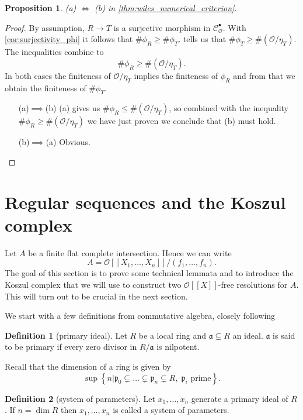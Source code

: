 \documentclass{article}
\theoremstyle{plain}%
\newtheorem{proposition}{Proposition}[section]
\theoremstyle{definition}
\newtheorem{definition}{Definition}[section]
\theoremstyle{remark}
\newcommand{\cob}{\mathcal{C}_\mathcal{O}^\bullet}
\begin{document}
\begin{proposition}\textup{\cite[cf.][corollary 5.6]{darmon1995fermat}}\label{prop:aequalsb}
    (a) \(\Leftrightarrow\) (b) in \cref{thm:wiles_numerical_criterion}.
\end{proposition}
\begin{proof}
    By assumption, \(R \to T\) is a surjective morphism in \(\cob\).
    With \cref{cor:surjectivity_phi} it follows that \(\#\phi_R \geq \#\phi_T\).  
    tells us that \(\#\phi_T \geq \#(\mathcal{O}/\eta_T)\).
    The inequalities combine to \[\#\phi_R \geq \#(\mathcal{O}/\eta_T).\]
    In both cases the finiteness of \(\mathcal{O}/\eta_T\) implies the finiteness of \(\phi_R\)
    and from that we obtain the finiteness of \(\#\phi_T\).
    \begin{itemize}
        \item[(a)\(\implies\)(b)] (a) gives us \(\#\phi_R \leq \#(\mathcal{O}/\eta_T)\), so combined with the 
        inequality \(\#\phi_R \geq \#(\mathcal{O}/\eta_T)\) we have just proven we conclude that (b) must hold.
        \item[(b)\(\implies\)(a)] Obvious.
    \end{itemize}      
\end{proof}

\section{Regular sequences and the Koszul complex}
Let \(A\) be a finite flat complete intersection. Hence we can write 
\[A = \mathcal{O}[[X_1, \dots, X_n]]/(f_1, \dots, f_n).\]
The goal of this section is to prove some technical lemmata and to introduce
the Koszul complex that we will use to construct two \(\mathcal{O}[[X]]\)-free resolutions for \(A\).
This will turn out to be crucial in the next section.

We start with a few definitions from commutative algebra, closely following \cite[sec. 5.3]{darmon1995fermat}
\begin{definition}[primary ideal]
    Let \(R\) be a local ring and \(\mathfrak{a} \subsetneq R\) an ideal. 
    \(\mathfrak{a}\) is said to be primary if every zero divisor in \(R/\mathfrak{a}\) is nilpotent.
\end{definition}
Recall that the dimension of a ring is given by
\[
    \sup \left\{n | 
                \mathfrak{p}_0 \subsetneq \dots \subsetneq \mathfrak{p}_n \subsetneq R,\; \mathfrak{p}_i \text{ prime} 
        \right\}.
\]
\begin{definition}[system of parameters]
    Let \(x_1, \dots, x_n\) generate a primary ideal of \(R\). If \(n = \dim R\) then \(x_1, \dots, x_n\) is called 
    a system of parameters.
\end{definition}
\end{document}
